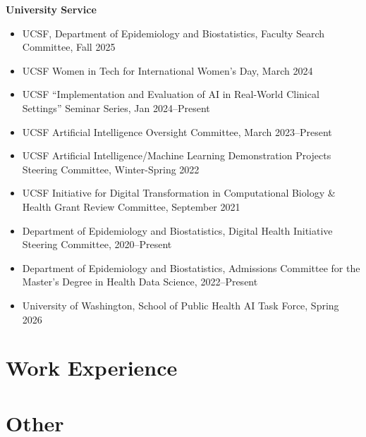\documentclass[11pt,a4paper,sans]{moderncv}        %
\begin{document}
\textbf{University Service}
\begin{itemize}
    \item UCSF, Department of Epidemiology and Biostatistics, Faculty Search Committee, Fall 2025
	\item UCSF Women in Tech for International Women's Day, March 2024 
	\item UCSF ``Implementation and Evaluation of AI in Real-World Clinical Settings'' Seminar Series, Jan 2024--Present
	\item UCSF Artificial Intelligence Oversight Committee, March 2023--Present
    \item UCSF Artificial Intelligence/Machine Learning Demonstration Projects Steering Committee, Winter-Spring 2022
	\item UCSF Initiative for Digital Transformation in Computational Biology \& Health Grant Review Committee, September 2021
	\item Department of Epidemiology and Biostatistics, Digital Health Initiative Steering Committee, 2020--Present
	\item Department of Epidemiology and Biostatistics, Admissions Committee for the Master's Degree in Health Data Science, 2022--Present
    \item University of Washington, School of Public Health AI Task Force, Spring 2026
\end{itemize}

\section{Work Experience}

\section{Other}
\end{document}
